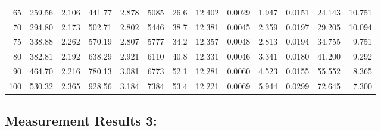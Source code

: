 \documentclass[10pt]{article}
\begin{document}
{\begin{tabular}{|r|rr|rr|rr|rr|rr|r|r|}
       65 &       259.56 &        2.106 &       441.77 &        2.878 &         5085 &         26.6 &       12.402 &       0.0029 &        1.947 &       0.0151 &       24.143 &       10.751 \\
       70 &       294.80 &        2.173 &       502.71 &        2.802 &         5446 &         38.7 &       12.381 &       0.0045 &        2.359 &       0.0197 &       29.205 &       10.094 \\
       75 &       338.88 &        2.262 &       570.19 &        2.807 &         5777 &         34.2 &       12.357 &       0.0048 &        2.813 &       0.0194 &       34.755 &        9.751 \\
       80 &       382.81 &        2.192 &       638.29 &        2.921 &         6110 &         40.8 &       12.331 &       0.0046 &        3.341 &       0.0180 &       41.200 &        9.292 \\
       90 &       464.70 &        2.216 &       780.13 &        3.081 &         6773 &         52.1 &       12.281 &       0.0060 &        4.523 &       0.0155 &       55.552 &        8.365 \\
      100 &       530.32 &        2.365 &       928.56 &        3.184 &         7384 &         53.4 &       12.221 &       0.0069 &        5.944 &       0.0299 &       72.645 &        7.300 \\
\hline
\end{tabular}
}



\subsection*{\large \bf Measurement Results 3:}
\end{document}
